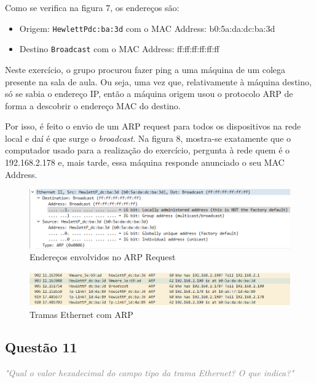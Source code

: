 \documentclass{llncs}
\newcommand{\questionE}[1]{\textcolor{gray}{\textit{"#1"}}}
\begin{document}
Como se verifica na figura 7, os endereços são:

\begin{itemize}

    \item Origem: \verb|HewlettPdc:ba:3d| com o MAC Address: b0:5a:da:dc:ba:3d
    
    \item Destino \verb|Broadcast| com o MAC Address: ff:ff:ff:ff:ff:ff
    
\end{itemize}

Neste exercício, o grupo procurou fazer ping a uma máquina de um colega presente na sala de aula. Ou seja, uma vez que, relativamente à máquina destino, só se sabia o endereço IP, então a máquina origem usou o protocolo ARP de forma a descobrir o endereço MAC do destino.

Por isso, é feito o envio de um ARP request para todos os dispositivos na rede local e daí é que surge o \textit{broadcast}. Na figura 8, mostra-se exatamente que o computador usado para a realização do exercício, pergunta à rede quem é o 192.168.2.178 e, mais tarde, essa máquina responde anunciado o seu MAC Address.

\begin{figure}[H]
\begin{center}
\includegraphics[width=13cm]{10_2.PNG}
\end{center}
\caption{Endereços envolvidos no ARP Request}
\end{figure}

\begin{figure}[H]
\begin{center}
\includegraphics[width=12cm]{10_1.PNG}
\end{center}
\caption{Tramas Ethernet com ARP}
\end{figure}

\subsection{Questão 11}
\hspace{3mm} 
\questionE{Qual o valor hexadecimal do campo tipo da trama Ethernet? O que indica?}\\
\end{document}
